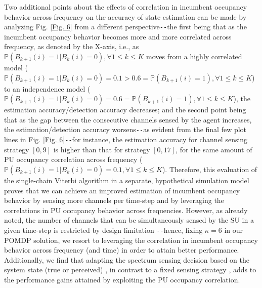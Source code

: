 Two additional points about the effects of correlation in incumbent occupancy behavior across frequency on the accuracy of state estimation can be made by analyzing Fig. \ref{Fig. 6} from a different perspective\texttt{-{}-}the first being that as the incumbent occupancy behavior becomes more and more correlated across frequency, as denoted by the X-axis, i.e., as $\mathbb{P}(B_{k+1}(i){=}1|B_{k}(i){=}0),{\forall}1{\leq}k{\leq}K$ moves from a highly correlated model ($\mathbb{P}(B_{k+1}(i){=}1|B_{k}(i){=}0){=}0.1{>}0.6{=}\mathbb{P}(B_{k+1}(i){=}1),{\forall}1{\leq}k{\leq}K$) to an independence model ($\mathbb{P}(B_{k+1}(i){=}1|B_{k}(i){=}0){=}0.6{=}\mathbb{P}(B_{k+1}(i){=}1),{\forall}1{\leq}k{\leq}K$), the estimation accuracy/detection accuracy decreases; and the second point being that as the gap between the consecutive channels sensed by the agent increases, the estimation/detection accuracy worsens\texttt{-{}-}as evident from the final few plot lines in Fig. \ref{Fig. 6}\texttt{-{}-}for instance, the estimation accuracy for channel sensing strategy $[0,9]$ is higher than that for strategy $[0,17]$, for the same amount of PU occupancy correlation across frequency ($\mathbb{P}(B_{k+1}(i){=}1|B_{k}(i){=}0){=}0.1,{\forall}1{\leq}k{\leq}K$). Therefore, this evaluation of the single-chain Viterbi algorithm in a separate, hypothetical simulation model proves that we can achieve  an improved estimation of incumbent occupancy behavior by sensing more channels per time-step and by leveraging the correlations in PU occupancy behavior across frequencies. However, as already noted, the number of channels that can be simultaneously sensed by the SU in a given time-step is restricted by design limitation \cite{WCL:3}\texttt{-{}-}hence, fixing $\kappa{=}6$ in our POMDP solution, we resort to leveraging the correlation in incumbent occupancy behavior across frequency (and time) in order to attain better performance. Additionally, we find that adapting the spectrum sensing decision based on the system state (true or perceived) \cite{WCL:paper, WCL:5}, in contrast to a fixed sensing strategy \cite{WCL:6, WCL:7}, adds to the performance gains attained by exploiting the PU occupancy correlation.

